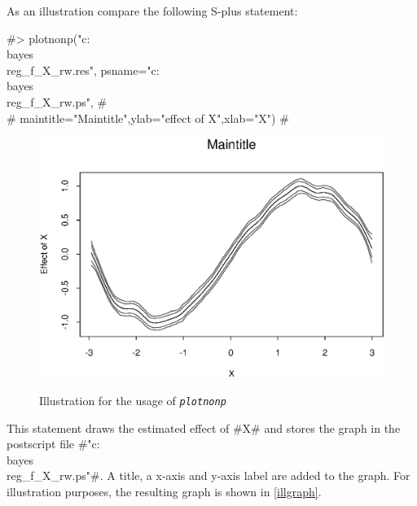 As an illustration compare the following S-plus statement:

#> plotnonp("c:\\bayes\\reg_f_X_rw.res", psname="c:\\bayes\\reg_f_X_rw.ps", #\\
#  maintitle="Maintitle",ylab="effect of X",xlab="X") #

\begin{figure}[ht]
\begin{center}
\includegraphics[scale=0.8]{grafiken/plotnonp.eps}
{\em\caption{ \label{illgraph} Illustration for the usage of
\em\tt plotnonp}}
\end{center}
\end{figure}

This statement draws the estimated effect of #X# and stores the
graph in the postscript file #"c:\\bayes\\reg_f_X_rw.ps"#. A
title, a x-axis and y-axis label are added to the graph. For
illustration purposes, the resulting graph is shown in
\autoref{illgraph}.

